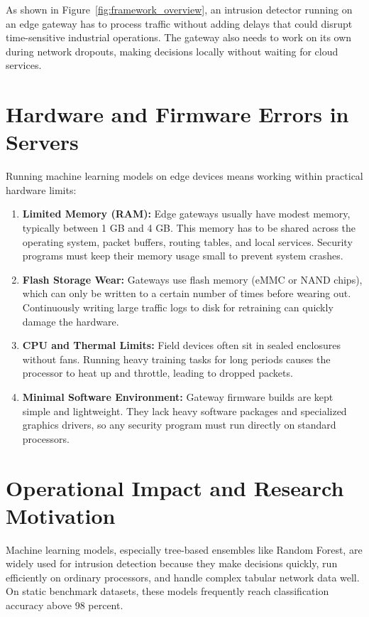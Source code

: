 As shown in Figure~\ref{fig:framework_overview}, an intrusion detector running on an edge gateway has to process traffic without adding delays that could disrupt time-sensitive industrial operations. The gateway also needs to work on its own during network dropouts, making decisions locally without waiting for cloud services.

\section{Hardware and Firmware Errors in Servers}
\label{sec:hardware_firmware_constraints}

Running machine learning models on edge devices means working within practical hardware limits:

\begin{enumerate}
    \item \textbf{Limited Memory (RAM):} Edge gateways usually have modest memory, typically between 1 GB and 4 GB. This memory has to be shared across the operating system, packet buffers, routing tables, and local services. Security programs must keep their memory usage small to prevent system crashes.
    \item \textbf{Flash Storage Wear:} Gateways use flash memory (eMMC or NAND chips), which can only be written to a certain number of times before wearing out. Continuously writing large traffic logs to disk for retraining can quickly damage the hardware.
    \item \textbf{CPU and Thermal Limits:} Field devices often sit in sealed enclosures without fans. Running heavy training tasks for long periods causes the processor to heat up and throttle, leading to dropped packets.
    \item \textbf{Minimal Software Environment:} Gateway firmware builds are kept simple and lightweight. They lack heavy software packages and specialized graphics drivers, so any security program must run directly on standard processors.
\end{enumerate}

\section{Operational Impact and Research Motivation}
\label{sec:operational_impact_motivation}

Machine learning models, especially tree-based ensembles like Random Forest, are widely used for intrusion detection because they make decisions quickly, run efficiently on ordinary processors, and handle complex tabular network data well. On static benchmark datasets, these models frequently reach classification accuracy above 98 percent.

